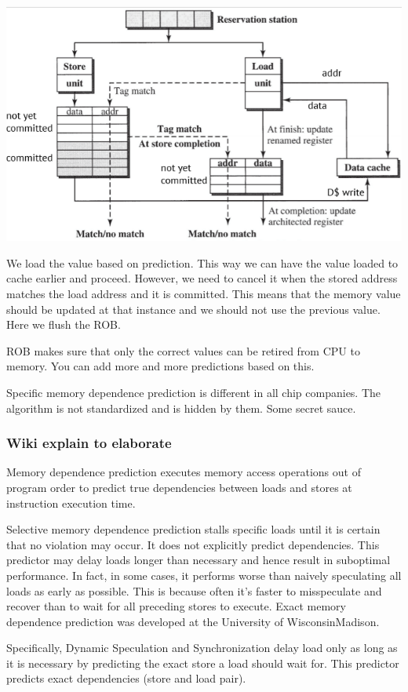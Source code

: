 \documentclass[letterpaper,12pt]{article}
\begin{document}
\includegraphics*[scale = 0.7]{./Image/load dependency predictor.png}

We load the value based on prediction. This way we can have the value loaded to cache earlier and proceed. However, we need to cancel it when the stored address matches the load address and it is committed. This means that the memory value should be updated at that instance and we should not use the previous value. Here we flush the ROB.

ROB makes sure that only the correct values can be retired from CPU to memory. You can add more and more predictions based on this.

Specific memory dependence prediction is different in all chip companies. The algorithm is not standardized and is hidden by them. Some secret sauce.
\subsubsection{Wiki explain to elaborate}
Memory dependence prediction executes memory access operations out of program order to predict true dependencies between loads and stores at instruction execution time.

Selective memory dependence prediction stalls specific loads until it is certain that no violation may occur. It does not explicitly predict dependencies. This predictor may delay loads longer than necessary and hence result in suboptimal performance. In fact, in some cases, it performs worse than naively speculating all loads as early as possible. This is because often it's faster to misspeculate and recover than to wait for all preceding stores to execute. Exact memory dependence prediction was developed at the University of Wisconsin\-Madison.

Specifically, Dynamic Speculation and Synchronization delay load only as long as it is necessary by predicting the exact store a load should wait for. This predictor predicts exact dependencies (store and load pair).
\end{document}
